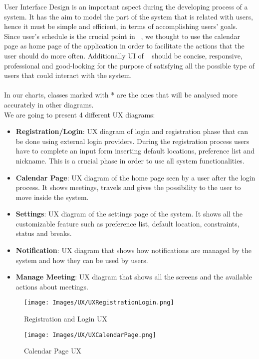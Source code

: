 User Interface Design is an important aspect during the developing process of a system. It has the aim to model the part of the system that is related with users, hence it must be simple and efficient, in terms of accomplishing users' goals. Since user's schedule is the crucial point in \projectname~, we thought to use the calendar page as home page of the application in order to facilitate the actions that the user should do more often. Additionally UI of \projectname~ should be concise, responsive, professional and good-looking for the purpose of satisfying all the possible type of users that could interact with the system.\\
\\
In our charts, classes marked with * are the ones that will be analysed more accurately in other diagrams.\\
We are going to present 4 different UX diagrams:
\begin{itemize}
	\item{\textbf{Registration/Login}}: UX diagram of login and registration phase that can be done using external login providers. During the registration process users have to complete an input form inserting default locations, preference list and nickname. This is a crucial phase in order to use all system functionalities.
	\item{\textbf{Calendar Page}}: UX diagram of the home page seen by a user after the login process. It shows meetings, travels and gives the possibility to the user to move inside the system.
	\item{\textbf{Settings}}: UX diagram of the settings page of the system. It shows all the customizable feature such as preference list, default location, constraints, status and breaks.
	\item{\textbf{Notification}}: UX diagram that shows how notifications are managed by the system and how they can be used by users.
	\item{\textbf{Manage Meeting}}: UX diagram that shows all the screens and the available actions about meetings.
\end{itemize}

\begin{figure}[h]
	\centering\texttt{[image: Images/UX/UXRegistrationLogin.png]}{}
	\caption{Registration and Login UX}
\end{figure}

\begin{figure}[h]
	\centering\texttt{[image: Images/UX/UXCalendarPage.png]}{}
	\caption{Calendar Page UX}
\end{figure}

